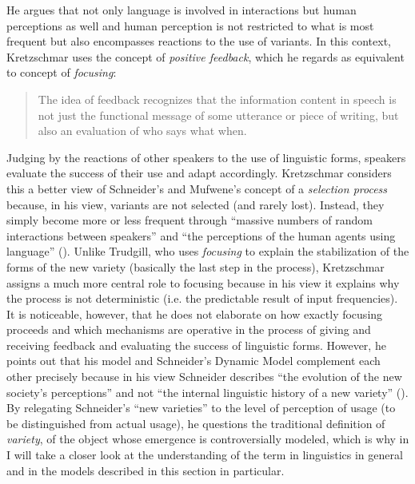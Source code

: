 He argues that not only language is involved in interactions but human perceptions as well and human perception is not restricted to what is most frequent but also encompasses reactions to the use of variants. In this context, Kretzschmar uses the concept of \textit{positive feedback}, which he regards as equivalent to  concept of \textit{focusing}:

\begin{quote}
The idea of feedback recognizes that the information content in speech is not just the functional message of some utterance or piece of writing, but also an evaluation of who says what when. \citep[151]{Kretzschmar2014}
\end{quote}


Judging by the reactions of other speakers to the use of linguistic forms, speakers evaluate the success of their use and adapt accordingly. Kretzschmar considers this a better view of Schneider’s and Mufwene’s concept of a \textit{selection process} because, in his view, variants are not selected (and rarely lost). Instead, they simply become more or less frequent through “massive numbers of random interactions between speakers” and “the perceptions of the human agents using language” (\citeyear[152]{Kretzschmar2014}). Unlike Trudgill, who uses \textit{focusing} to explain the stabilization of the forms of the new variety (basically the last step in the process), Kretzschmar assigns a much more central role to focusing because in his view it explains why the process is not deterministic (i.e. the predictable result of input frequencies). It is noticeable, however, that he does not elaborate on how exactly focusing proceeds and which mechanisms are operative in the process of giving and receiving feedback and evaluating the success of linguistic forms. However, he points out that his model and Schneider’s Dynamic Model complement each other precisely because in his view Schneider describes “the evolution of the new society’s perceptions” and not “the internal linguistic history of a new variety” (\citeyear[157]{Kretzschmar2014}). By relegating Schneider’s “new varieties” to the level of perception of usage (to be distinguished from actual usage), he questions the traditional definition of \textit{variety}, of the object whose emergence is controversially modeled, which is why in  I will take a closer look at the understanding of the term in linguistics in general and in the models described in this section in particular.


